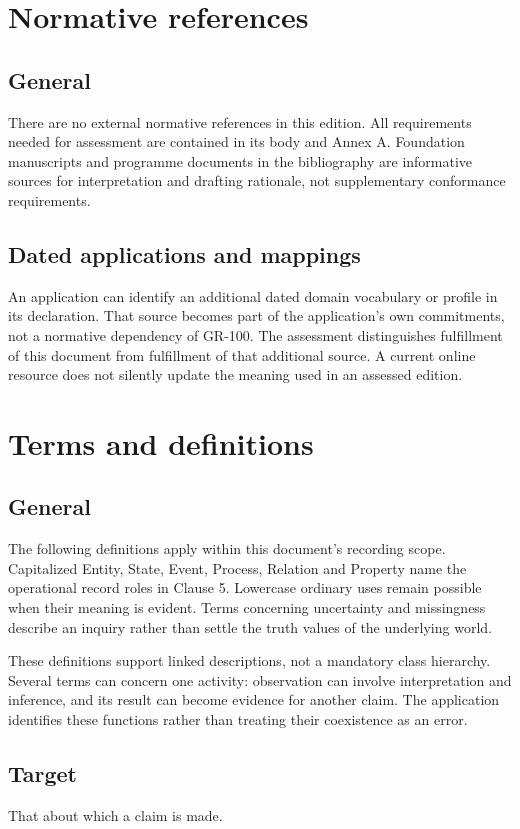 \documentclass[11pt,a4paper]{article}
\begin{document}
\section{Normative references}
\subsection{General}
There are no external normative references in this edition. All requirements needed for assessment are contained in its body and Annex A. Foundation manuscripts and programme documents in the bibliography are informative sources for interpretation and drafting rationale, not supplementary conformance requirements.

\subsection{Dated applications and mappings}
An application can identify an additional dated domain vocabulary or profile in its declaration. That source becomes part of the application's own commitments, not a normative dependency of GR-100. The assessment distinguishes fulfillment of this document from fulfillment of that additional source. A current online resource does not silently update the meaning used in an assessed edition.

\section{Terms and definitions}
\subsection{General}
The following definitions apply within this document's recording scope. Capitalized Entity, State, Event, Process, Relation and Property name the operational record roles in Clause 5. Lowercase ordinary uses remain possible when their meaning is evident. Terms concerning uncertainty and missingness describe an inquiry rather than settle the truth values of the underlying world.

These definitions support linked descriptions, not a mandatory class hierarchy. Several terms can concern one activity: observation can involve interpretation and inference, and its result can become evidence for another claim. The application identifies these functions rather than treating their coexistence as an error.

\subsection{Target}
That about which a claim is made.
\end{document}
